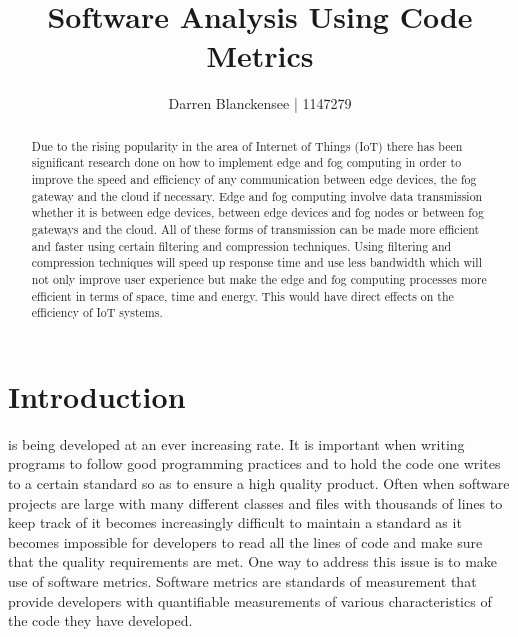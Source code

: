 \documentclass[11pt,journal, a4paper]{IEEEtran}
\title{\LARGE {Software  Analysis Using Code Metrics}}
\author{\small {Darren Blanckensee | 1147279}}
\begin{document}
	
	\maketitle


\begin{abstract}
Due to the rising popularity in the area of Internet of Things (IoT) there has been significant research done on how to implement edge and fog computing in order to improve the speed and efficiency of any communication between edge devices, the fog gateway and the cloud if necessary. Edge and fog computing involve data transmission whether it is between edge devices, between edge devices and fog nodes or between fog gateways and the cloud. All of these forms of transmission can be made more efficient and faster using certain filtering and compression techniques. Using filtering and compression techniques will speed up response time and use less bandwidth which  will not only improve user experience but make the edge and fog computing processes more efficient in terms of space, time and energy. This would have direct effects on the efficiency of IoT systems. 
\end{abstract}



\section{Introduction}
\noindent
{} is being developed at an ever increasing rate. It is important when writing programs to follow good programming practices and to hold the code one writes to a certain standard so as to ensure a high quality product. Often when software projects are large with many different classes and files with thousands of lines to keep track of it becomes increasingly difficult to maintain a standard as it becomes impossible for developers to read all the lines of code and make sure that the quality requirements are met. One way to address this issue is to make use of software metrics. Software metrics are standards of measurement that provide developers with quantifiable measurements of various characteristics of the code they have developed. \\
\end{document}

